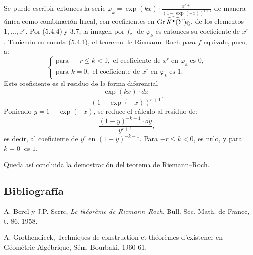 Se puede escribir entonces la serie
\(\varphi_k=\exp(kx)\cdot\frac{x^{r+1}}{(1-\exp(-x))^{r+1}}\) de manera única
como combinación lineal, con coeficientes en
\(\widehat{\operatorname{Gr} K^{\bullet}(Y)_{\mathbb Q}}\), de los elementos \(1,\ldots,x^r\). Por
(5.4.4) y 3.7, la imagen por \(f_{\mathrm{gr}}\) de \(\varphi_k\) es entonces
su coeficiente de \(x^r\). Teniendo en cuenta (5.4.1), el teorema de
Riemann--Roch para \(f\) equivale, pues, a:
\[
\left\{
\begin{array}{ll}
\text{para }-r\leq k<0,\text{ el coeficiente de }x^r\text{ en }\varphi_k\text{ es }0,\\
\text{para }k=0,\text{ el coeficiente de }x^r\text{ en }\varphi_k\text{ es }1.
\end{array}
\right.
\tag{RR}
\]
Este coeficiente es el residuo de la forma diferencial
\[
 \frac{\exp(kx)\cdot dx}{(1-\exp(-x))^{r+1}}.
\]
Poniendo \(y=1-\exp(-x)\), se reduce el cálculo al residuo de:
\[
 \frac{(1-y)^{-k-1}\cdot dy}{y^{r+1}},
\]
es decir, al coeficiente de \(y^r\) en \((1-y)^{-k-1}\). Para
\(-r\leq k<0\), es nulo, y para \(k=0\), es \(1\).

Queda así concluida la demostración del teorema de Riemann--Roch.

\subsection*{Bibliografía}
\begin{enumerate}[label={[\arabic*]}]
\item A. Borel y J.P. Serre, \emph{Le théorème de Riemann--Roch}, Bull. Soc. Math. de France, t. 86, 1958.
\item A. Grothendieck, Techniques de construction et théorèmes d'existence en Géométrie Algébrique, Sém. Bourbaki, 1960-61.
\end{enumerate}

